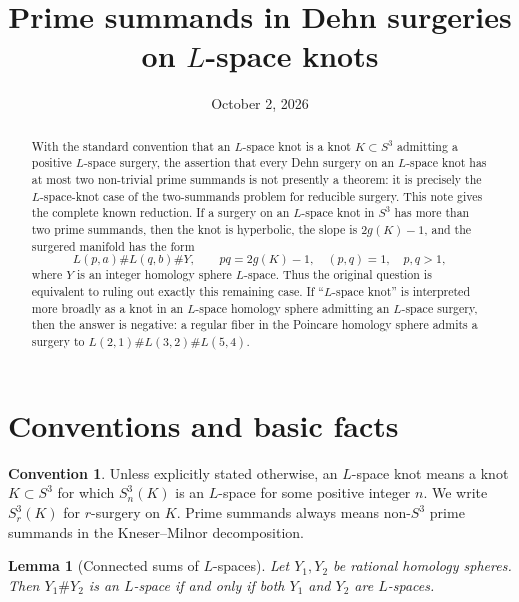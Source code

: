 \documentclass[11pt]{article}
\title{Prime summands in Dehn surgeries on \(L\)-space knots}
\author{}
\date{October 2, 2026}
\newtheorem{lemma}[theorem]{Lemma}
\theoremstyle{definition}
\newtheorem{convention}[theorem]{Convention}
\theoremstyle{remark}
\begin{document}
\maketitle

\begin{abstract}
With the standard convention that an \(L\)-space knot is a knot
\(K\subset S^{3}\) admitting a positive \(L\)-space surgery, the assertion that
every Dehn surgery on an \(L\)-space knot has at most two non-trivial prime
summands is not presently a theorem: it is precisely the \(L\)-space-knot case
of the two-summands problem for reducible surgery.  This note gives the
complete known reduction.  If a surgery on an \(L\)-space knot in \(S^{3}\)
has more than two prime summands, then the knot is hyperbolic, the slope is
\(2g(K)-1\), and the surgered manifold has the form
\[
        L(p,a)\# L(q,b)\# Y,
        \qquad pq=2g(K)-1,\quad (p,q)=1,\quad p,q>1,
\]
where \(Y\) is an integer homology sphere \(L\)-space.  Thus the original
question is equivalent to ruling out exactly this remaining case.  If
``\(L\)-space knot'' is interpreted more broadly as a knot in an \(L\)-space
homology sphere admitting an \(L\)-space surgery, then the answer is negative:
a regular fiber in the Poincare homology sphere admits a surgery to
\(L(2,1)\#L(3,2)\#L(5,4)\).
\end{abstract}

\section{Conventions and basic facts}

\begin{convention}
Unless explicitly stated otherwise, an \(L\)-space knot means a knot
\(K\subset S^{3}\) for which \(S^{3}_{n}(K)\) is an \(L\)-space for some
positive integer \(n\).  We write \(S^{3}_{r}(K)\) for \(r\)-surgery on \(K\).
Prime summands always means non-\(S^{3}\) prime summands in the
Kneser--Milnor decomposition.
\end{convention}

\begin{lemma}[Connected sums of \(L\)-spaces]
Let \(Y_{1},Y_{2}\) be rational homology spheres.  Then
\(Y_{1}\#Y_{2}\) is an \(L\)-space if and only if both \(Y_{1}\) and \(Y_{2}\)
are \(L\)-spaces.
\end{lemma}
\end{document}
